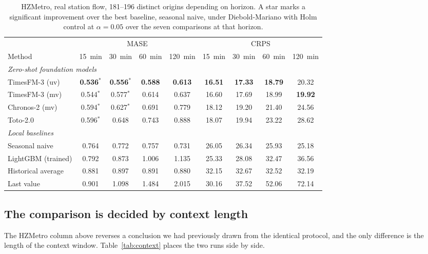\documentclass[11pt]{article}
\theoremstyle{plain}
\theoremstyle{definition}
\theoremstyle{remark}
\newcommand{\best}[1]{\textbf{#1}}
\begin{document}
\begin{table}[htbp]
\centering
\caption{HZMetro, real station flow, \num{181}--\num{196} distinct origins depending on horizon. A star marks a significant improvement over the best baseline, seasonal naive, under Diebold-Mariano with Holm control at $\alpha=0.05$ over the seven comparisons at that horizon.}
\label{tab:hzmetro}
\small
\begin{tabular}{lcccccccc}
\toprule
& \multicolumn{4}{c}{MASE} & \multicolumn{4}{c}{CRPS} \\
\cmidrule(lr){2-5}\cmidrule(lr){6-9}
Method & \SI{15}{\minute} & \SI{30}{\minute} & \SI{60}{\minute} & \SI{120}{\minute} & \SI{15}{\minute} & \SI{30}{\minute} & \SI{60}{\minute} & \SI{120}{\minute} \\
\midrule
\multicolumn{9}{l}{\emph{Zero-shot foundation models}}\\
TimesFM-3 (uv)          & \best{0.536}$^{*}$ & \best{0.556}$^{*}$ & \best{0.588} & \best{0.613} & \best{16.51} & \best{17.33} & \best{18.79} & 20.32 \\
TimesFM-3 (mv)          & 0.544$^{*}$ & 0.577$^{*}$ & 0.614 & 0.637 & 16.60 & 17.69 & 18.99 & \best{19.92} \\
Chronos-2 (mv)          & 0.594$^{*}$ & 0.627$^{*}$ & 0.691 & 0.779 & 18.12 & 19.20 & 21.40 & 24.56 \\
Toto-2.0                & 0.596$^{*}$ & 0.648 & 0.743 & 0.888 & 18.07 & 19.94 & 23.22 & 28.62 \\
\midrule
\multicolumn{9}{l}{\emph{Local baselines}}\\
Seasonal naive          & 0.764 & 0.772 & 0.757 & 0.731 & 26.05 & 26.34 & 25.93 & 25.18 \\
LightGBM (trained)      & 0.792 & 0.873 & 1.006 & 1.135 & 25.33 & 28.08 & 32.47 & 36.56 \\
Historical average      & 0.881 & 0.897 & 0.891 & 0.880 & 32.15 & 32.67 & 32.52 & 32.19 \\
Last value              & 0.901 & 1.098 & 1.484 & 2.015 & 30.16 & 37.52 & 52.06 & 72.14 \\
\bottomrule
\end{tabular}
\end{table}

\subsection{The comparison is decided by context length}
\label{sec:context}

The HZMetro column above reverses a conclusion we had previously drawn from the identical protocol, and the only difference is the length of the context window. Table~\ref{tab:context} places the two runs side by side.
\end{document}
